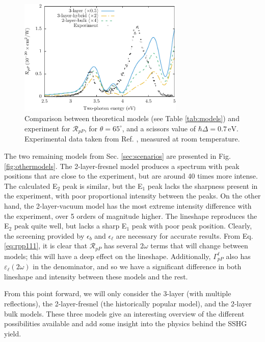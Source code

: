 \begin{figure}[t]
\centering 
\includegraphics[width=0.7\textwidth]{content/figures/fig-Si1x1-Mejia_RpP}
\caption{Comparison between theoretical models (see Table \ref{tab:models}) and
experiment for $\mathcal{R}_{pP}$, for $\theta=65^{\circ}$, and a scissors value
of $\hbar\Delta = 0.7\,\text{eV}$. Experimental data taken from Ref. 
\cite{mejiaPRB02}, measured at room temperature.}
\label{fig:RpP}
\end{figure}

The two remaining models from Sec. \ref{sec:scenarios} are presented in Fig.
\ref{fig:othermodels}. The 2-layer-fresnel model produces a spectrum with peak
positions that are close to the experiment, but are around 40 times more
intense. The calculated E$_{2}$ peak is similar, but the E$_{1}$ peak lacks the
sharpness present in the experiment, with poor proportional intensity between
the peaks. On the other hand, the 2-layer-vacuum model has the most extreme
intensity difference with the experiment, over 5 orders of magnitude higher. The
lineshape reproduces the E$_{2}$ peak quite well, but lacks a sharp E$_{1}$ peak
with poor peak position. Clearly, the screening provided by $\epsilon_{b}$ and
$\epsilon_{\ell}$ are necessary for accurate results. From Eq.
\eqref{eq:rpp111}, it is clear that $\mathcal{R}_{pP}$ has several $2\omega$
terms that will change between models; this will have a deep effect on the
lineshape. Additionally, $\Gamma^{\ell}_{pP}$ also has
$\varepsilon_{\ell}(2\omega)$ in the denominator, and so we have a significant
difference in both lineshape and intensity between these models and the rest.

From this point forward, we will only consider the 3-layer (with multiple
reflections), the 2-layer-fresnel (the historically popular model), and the
2-layer bulk models. These three models give an interesting overview of the
different possibilities available and add some insight into the physics behind
the SSHG yield.

